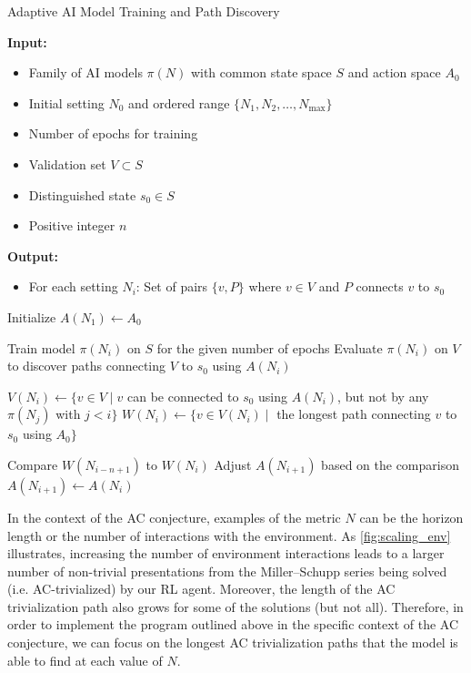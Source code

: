\begin{algorithm}
	\caption{Adaptive AI Model Training and Path Discovery}
	\label{alg:adaptive_ai_model}
	\begin{algorithmic}[1]
		\State \textbf{Input:}
		\begin{itemize}
			\item[] Family of AI models $\pi(N)$ with common state space $S$ and action space $A_0$
			\item[] Initial setting $N_0$ and ordered range $\{N_1, N_2, \ldots, N_{\text{max}}\}$
			\item[] Number of epochs for training
			\item[] Validation set $V \subset S$
			\item[] Distinguished state $s_0 \in S$
			\item[] Positive integer $n$
		\end{itemize}
		
		\State \textbf{Output:}
		\begin{itemize}
			\item[] For each setting $N_i$: Set of pairs $\{v, P\}$ where $v \in V$ and $P$ connects $v$ to $s_0$
		\end{itemize}
		
		\State Initialize $A(N_1) \gets A_0$
		
		\State Train model $\pi(N_i)$ on $S$ for the given number of epochs
		\State Evaluate $\pi(N_i)$ on $V$ to discover paths connecting $V$ to $s_0$ using $A(N_i)$
		
		\State $V(N_i) \gets \{ v \in V \mid v$ can be connected to $s_0$ using $A(N_i)$, but not by any $\pi(N_j)$ with $j < i\}$
		\State $W(N_i) \gets \{ v \in V(N_i) \mid$ the longest path connecting $v$ to $s_0$ using $A_0 \}$
		
		\State Compare $W(N_{i-n+1})$ to $W(N_i)$
		\State Adjust $A(N_{i+1})$ based on the comparison
		\Else
		\State $A(N_{i+1}) \gets A(N_i)$
		\EndIf
		\EndFor
	\end{algorithmic}
\end{algorithm}

In the context of the AC conjecture, examples of the metric $N$ can be the horizon length or the number of interactions with the environment. As \autoref{fig:scaling_env} illustrates, increasing the number of environment interactions leads to a larger number of non-trivial presentations from the Miller--Schupp series being solved (i.e. AC-trivialized) by our RL agent. Moreover, the length of the AC trivialization path also grows for some of the solutions (but not all).
%
Therefore, in order to implement the program outlined above in the specific context of the AC conjecture, we can focus on the longest AC trivialization paths that the model is able to find at each value of $N$.

